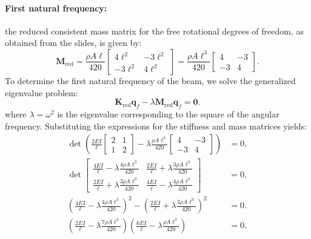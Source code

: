 \documentclass[12pt]{article}
\begin{document}
\paragraph{First natural frequency:} the reduced consistent mass matrix for the free rotational degrees of freedom, as obtained from the slides, is given by:
\[
    \mathbf{M}_\text{red} = \frac{\rho A \ell}{420}
    \begin{bmatrix}
        4\ell^2  & -3\ell^2 \\
        -3\ell^2 & 4\ell^2
    \end{bmatrix}=\frac{\rho A \ell^3}{420}
    \begin{bmatrix}
        4  & -3 \\
        -3 & 4
    \end{bmatrix}.
\]
To determine the first natural frequency of the beam, we solve the generalized eigenvalue problem:
\[
    \mathbf{K}_\text{red} \mathbf{q}_f - \lambda \mathbf{M}_\text{red} \mathbf{q}_f=\mathbf 0.
\]
where \( \lambda = \omega^2 \) is the eigenvalue corresponding to the square of the angular frequency. Substituting the expressions for the stiffness and mass matrices yields:
\begin{align*}
    \det\left( \frac{2EI}{\ell} \begin{bmatrix}
                                    2 & 1 \\
                                    1 & 2
                                \end{bmatrix}
    - \lambda\frac{\rho A \ell^3}{420}
    \begin{bmatrix}
        4  & -3 \\
        -3 & 4
    \end{bmatrix}\right)                                                                                                    & =0,  \\[5pt]
    \det\begin{bmatrix}
            \frac{4EI}{\ell} - \lambda\frac{4 \rho A\ell^3 }{420}  & \frac{2EI}{\ell} + \lambda\frac{3  \rho A\ell^3 }{420} \\[5pt]
            \frac{2EI}{\ell} + \lambda \frac{3 \rho A \ell^3}{420} & \frac{4EI}{\ell} -  \lambda\frac{4\rho A\ell^3 }{420}
        \end{bmatrix} & =0,     \\[5pt]
    \left( \frac{4EI}{\ell} - \lambda \frac{4\rho A\ell^3 }{420} \right)^2-
    \left( \frac{2EI}{\ell} + \lambda \frac{3 \rho A\ell^3 }{420} \right)^2                                                 & =0 . \\[5pt]
    \left( \frac{2EI}{\ell} - \lambda \frac{7\rho A\ell^3 }{420} \right)
    \left( \frac{6EI}{\ell} - \lambda \frac{\rho A\ell^3 }{420} \right)                                                     & =0 .
\end{align*}\vspace{-0.3cm}
\end{document}
